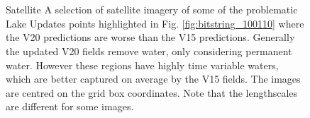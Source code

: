 \documentclass[hess, twostagejnl]{copernicus}
\providecommand{\DIFadd}[1]{{\protect\color{blue} \sf #1}} %
\providecommand{\DIFdel}[1]{{\protect\color{red} \scriptsize #1}} %
\providecommand{\DIFaddFL}[1]{\DIFadd{#1}} %
\providecommand{\DIFdelFL}[1]{\DIFdel{#1}} %
\providecommand{\DIFaddbeginFL}{} %
\providecommand{\DIFaddendFL}{} %
\providecommand{\DIFdelbeginFL}{} %
\providecommand{\DIFdelendFL}{} %
\begin{document}
\begin{figure}
{	} \DIFaddFL{\hspace{1mm} }\DIFaddendFL \\
	\DIFdelbeginFL %
\DIFdelFL{\hspace{1mm}
	}%
\DIFdelendFL \DIFaddbeginFL {} \DIFaddFL{\hspace{1mm}
	} \DIFaddFL{\hspace{1mm} }\\
	\DIFaddendFL \caption{\DIFdelbeginFL \DIFdelFL{Satellite }\DIFdelendFL \DIFaddbeginFL \DIFaddFL{A selection of satellite }\DIFaddendFL imagery of \DIFaddbeginFL \DIFaddFL{some of }\DIFaddendFL the problematic Lake Updates points highlighted in Fig. \ref{fig:bitstring_100110} where the V20 predictions are worse than the V15 predictions. Generally the updated V20 fields remove water, only considering permanent water. However these regions have highly time variable waters, which are better captured on average by the V15 fields. The images are centred on the grid box coordinates.\DIFdelbeginFL \DIFdelFL{Note that the lengthscales are different for some images.}\DIFdelendFL } 
	\label{fig:example_test}
\end{figure}
\end{document}
